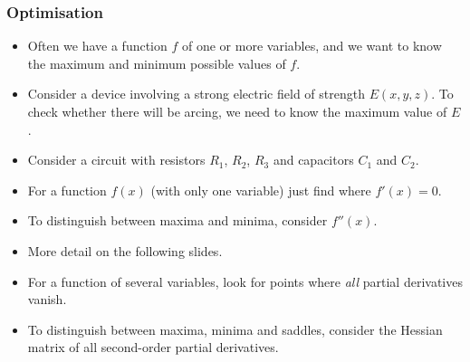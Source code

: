 \documentclass[9pt]{beamer}
\begin{document}
\begin{frame}[t]
 \frametitle{Optimisation}

 \begin{itemize}
  \item<1-> Often we have a function $f$ of one or more variables, and we
   want to know the maximum and minimum possible values of $f$.
  \item<2-> Consider a device involving a strong electric field of
   strength $E(x,y,z)$.  To check whether there will be arcing, we
   need to know the maximum value of $E$.
  \item<3-> Consider a circuit with resistors $R_1$, $R_2$, $R_3$ and
   capacitors $C_1$ and $C_2$.  
  \item<6->For a function $f(x)$ (with only one variable) just find where
   $f'(x)=0$.  \item<7->{To distinguish between maxima and minima, consider
   $f''(x)$.}\item<8->{  More detail on the following slides.}
  \item<9-> For a function of several variables, look for points where
   \emph{all} partial derivatives vanish.  \item<10->{To distinguish
    between maxima, minima and saddles, consider the Hessian matrix of
    all second-order partial derivatives.}
 \end{itemize}
\end{frame}
\end{document}
